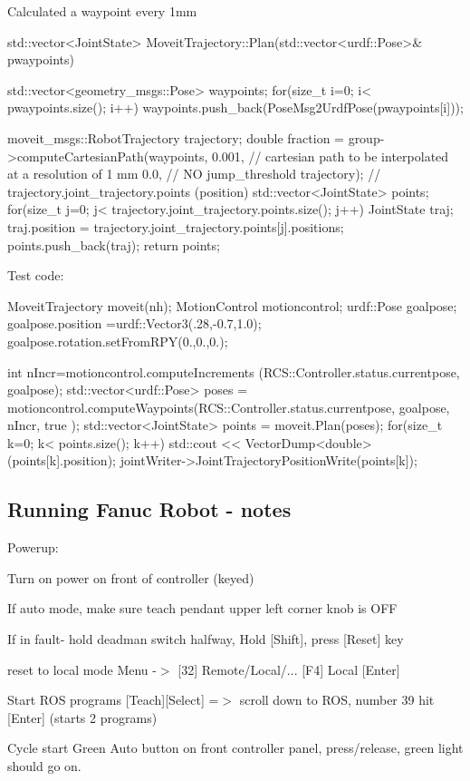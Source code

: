 Calculated a waypoint every 1mm \begin{DoxyVerb}std::vector<JointState> MoveitTrajectory::Plan(std::vector<urdf::Pose>& pwaypoints) {
    std::vector<geometry_msgs::Pose> waypoints;
    for(size_t i=0; i< pwaypoints.size(); i++)
    {    
        waypoints.push_back(PoseMsg2UrdfPose(pwaypoints[i]));
    }

    moveit_msgs::RobotTrajectory trajectory;
    double fraction = group->computeCartesianPath(waypoints,
            0.001, // cartesian path to be interpolated at a resolution of 1 mm 
            0.0, // NO jump_threshold
            trajectory);  // trajectory.joint_trajectory.points  (position)
    std::vector<JointState> points;
    for(size_t j=0; j< trajectory.joint_trajectory.points.size(); j++)
    {
        JointState traj;
        traj.position = trajectory.joint_trajectory.points[j].positions;
        points.push_back(traj);
    }
    return points;
}
\end{DoxyVerb}


Test code\-: \begin{DoxyVerb}       MoveitTrajectory moveit(nh);
        MotionControl motioncontrol;
        urdf::Pose goalpose;
        goalpose.position =urdf::Vector3(.28,-0.7,1.0);
        goalpose.rotation.setFromRPY(0.,0.,0.);

        int nIncr=motioncontrol.computeIncrements (RCS::Controller.status.currentpose, goalpose);
        std::vector<urdf::Pose> poses = motioncontrol.computeWaypoints(RCS::Controller.status.currentpose, goalpose, nIncr, true );
        std::vector<JointState> points = moveit.Plan(poses);
        for(size_t k=0; k< points.size(); k++)
        {
            std::cout <<  VectorDump<double> (points[k].position);
            jointWriter->JointTrajectoryPositionWrite(points[k]);
        }
\end{DoxyVerb}


\subsection*{Running Fanuc Robot -\/ notes }

Powerup\-:
\begin{DoxyEnumerate}
\item Turn on power on front of controller (keyed)
\item If auto mode, make sure teach pendant upper left corner knob is O\-F\-F
\item If in fault-\/ hold deadman switch halfway, Hold \mbox{[}Shift\mbox{]}, press \mbox{[}Reset\mbox{]} key
\item reset to local mode Menu -\/$>$ \mbox{[}32\mbox{]} Remote/\-Local/... \mbox{[}F4\mbox{]} Local \mbox{[}Enter\mbox{]}
\item Start R\-O\-S programs \mbox{[}Teach\mbox{]}\mbox{[}Select\mbox{]} =$>$ scroll down to R\-O\-S, number 39 hit \mbox{[}Enter\mbox{]} (starts 2 programs)
\item Cycle start Green Auto button on front controller panel, press/release, green light should go on.
\end{DoxyEnumerate}

